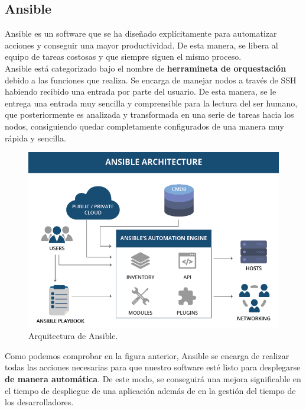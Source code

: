 

\subsection{Ansible}

Ansible\cite{ansible} es un software que se ha diseñado explícitamente para automatizar acciones y
conseguir una mayor productividad. De esta manera, se libera al equipo de tareas costosas
y que siempre siguen el mismo proceso.\\

Ansible está categorizado bajo el nombre de \textbf{herramineta de orquestación} debido a 
las funciones que realiza. Se encarga de manejar nodos a través de SSH habiendo recibido
una entrada por parte del usuario. De esta manera, se le entrega una entrada muy sencilla
y comprensible para la lectura del ser humano, que posteriormente es analizada y transformada
en una serie de tareas hacia los nodos, consiguiendo quedar completamente configurados de una
manera muy rápida y sencilla.\\


\begin{figure}[H]
	\centering
	\includegraphics[scale=0.45]{imagenes/ansible.png}
	\caption{Arquitectura de Ansible. \label{fig:figura7}}
\end{figure}

Como podemos comprobar en la figura anterior, Ansible se encarga de realizar todas las acciones
necesarias para que nuestro software esté listo para desplegarse \textbf{de manera automática}.
De este modo, se conseguirá una mejora significable en el tiempo de despliegue de una aplicación
además de en la gestión del tiempo de los desarrolladores.\\

